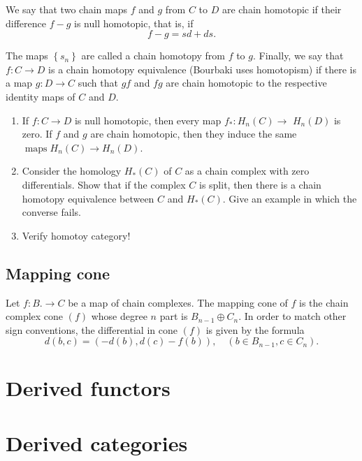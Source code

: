 We say that two chain maps $f$ and $g$ from $C$ to $D$ are chain homotopic if their difference $f-g$ is null homotopic, that is, if
      $$
      f-g=s d+d s .
      $$
      
      The maps $\left\{s_n\right\}$ are called a chain homotopy from $f$ to $g$. Finally, we say that $f: C \rightarrow D$ is a chain homotopy equivalence (Bourbaki uses homotopism) if there is a map $g: D \rightarrow C$ such that $g f$ and $f g$ are chain homotopic to the respective identity maps of $C$ and $D$.

\begin{prop}
    \begin{enumerate}
        \item If $f: C \rightarrow D$ is null homotopic, then every map $f_*: H_n(C) \rightarrow$ $H_n(D)$ is zero. If $f$ and $g$ are chain homotopic, then they induce the same $\operatorname{maps} H_n(C) \rightarrow H_n(D)$.
        \item Consider the homology $H_*(C)$ of $C$ as a chain complex with zero differentials. Show that if the complex $C$ is split, then there is a chain homotopy equivalence between $C$ and $H_*(C)$. Give an example in which the converse fails.
        \item Verify homotoy category!
    \end{enumerate}
\end{prop}

\subsection*{Mapping cone}
Let $f: B . \rightarrow C$ be a map of chain complexes. The mapping cone of $f$ is the chain complex cone $(f)$ whose degree $n$ part is $B_{n-1} \oplus C_n$. In order to match other sign conventions, the differential in cone $(f)$ is given by the formula
$$
d(b, c)=(-d(b), d(c)-f(b)), \quad\left(b \in B_{n-1}, c \in C_n\right) .
$$



\section{Derived functors}




\section{Derived categories}









